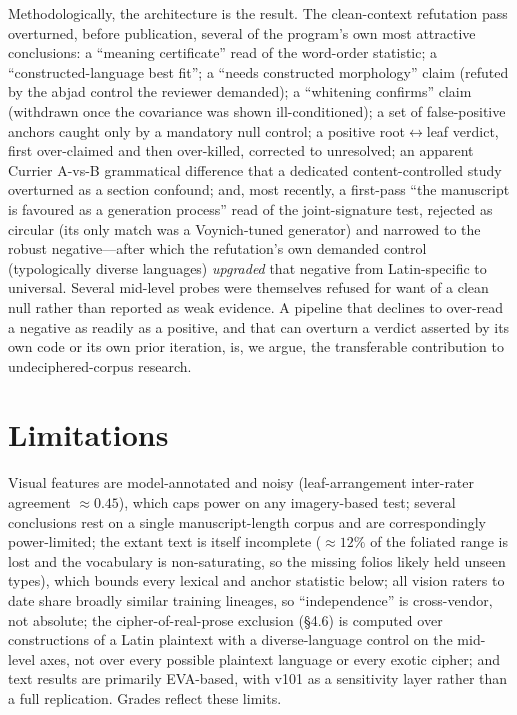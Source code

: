 \documentclass[11pt]{article}
\begin{document}
Methodologically, the architecture is the result. The clean-context refutation pass
overturned, before publication, several of the program's own most attractive
conclusions: a ``meaning certificate'' read of the word-order statistic; a
``constructed-language best fit''; a ``needs constructed morphology'' claim (refuted by
the abjad control the reviewer demanded); a ``whitening confirms'' claim (withdrawn
once the covariance was shown ill-conditioned); a set of false-positive anchors caught
only by a mandatory null control; a positive root$\leftrightarrow$leaf verdict, first
over-claimed and then over-killed, corrected to unresolved; an apparent Currier
A-vs-B grammatical difference that a dedicated content-controlled study overturned as a
section confound; and, most recently, a first-pass ``the manuscript is favoured as a
generation process'' read of the joint-signature test, rejected as circular (its only
match was a Voynich-tuned generator) and narrowed to the robust negative---after which
the refutation's own demanded control (typologically diverse languages) \emph{upgraded}
that negative from Latin-specific to universal. Several mid-level probes were themselves
refused for want of a clean null rather than reported as weak evidence. A pipeline that
declines to over-read a negative as readily as a positive, and that can overturn a
verdict asserted by its own code or its own prior iteration, is, we argue, the
transferable contribution to undeciphered-corpus research.

\section{Limitations}
Visual features are model-annotated and noisy (leaf-arrangement inter-rater agreement
$\approx 0.45$), which caps power on any imagery-based test; several conclusions rest
on a single manuscript-length corpus and are correspondingly power-limited; the extant
text is itself incomplete ($\approx\!12\%$ of the foliated range is lost and the
vocabulary is non-saturating, so the missing folios likely held unseen types), which
bounds every lexical and anchor statistic below; all vision raters to date share
broadly similar training lineages, so ``independence'' is cross-vendor, not absolute;
the cipher-of-real-prose exclusion (\S4.6) is computed over constructions of a Latin
plaintext with a diverse-language control on the mid-level axes, not over every possible
plaintext language or every exotic cipher; and text results are primarily EVA-based,
with v101 as a sensitivity layer rather than a full replication. Grades reflect these
limits.
\end{document}
